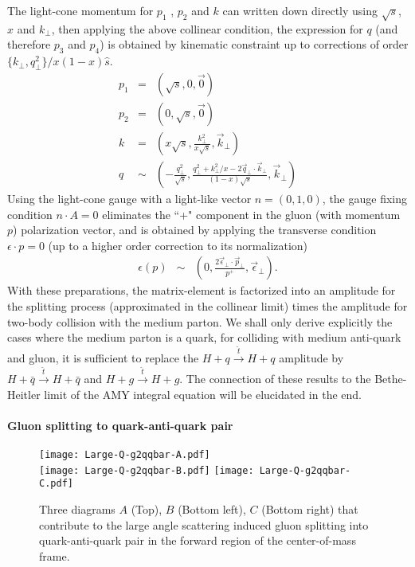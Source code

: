 \begin{appendices}
The light-cone momentum for $p_1$ , $p_2$ and $k$ can written down directly using $\sqrt{s}$, $x$ and $k_\perp$, then applying the above collinear condition, the expression for $q$ (and therefore $p_3$ and $p_4$) is obtained by kinematic constraint up to corrections of order $\{k_\perp, q_\perp^2\}/x(1-x)\hat{s}$.
\begin{eqnarray}
p_1 &=& (\sqrt{s}, 0, \vec{0})\\
p_2 &=& (0, \sqrt{s}, \vec{0})\\
k &=& (x\sqrt{s}, \frac{k_\perp^2}{x\sqrt{s}}, \vec{k}_\perp)\\
q &\sim& (-\frac{q_\perp^2}{\sqrt{s}}, \frac{q_\perp^2 + k_\perp^2/x - 
2\vec{q}_\perp \cdot \vec{k}_\perp}{(1-x)\sqrt{s}}, \vec{k}_\perp)
\end{eqnarray}
Using the light-cone gauge with a light-like vector $n = (0, 1, 0)$, the gauge fixing condition $n\cdot A =0$ eliminates the ``+" component in the gluon (with momentum $p$) polarization vector, and is obtained by applying the transverse condition $\epsilon \cdot p = 0$ (up to a higher order correction to its normalization)
\begin{eqnarray}
\epsilon(p) &\sim& (0, \frac{2\vec{\epsilon}_\perp\cdot\vec{p}_\perp}{p^+}, \vec{\epsilon}_\perp).
\end{eqnarray}
With these preparations, the matrix-element is factorized into an amplitude for the splitting process (approximated in the collinear limit) times the amplitude for two-body collision with the medium parton.
We shall only derive explicitly the cases where the medium parton is a quark, for colliding with medium anti-quark and gluon, it is sufficient to replace the $H+q\xrightarrow{\hat{t}} H+q$ amplitude by $H+\bar{q}\xrightarrow{\hat{t}} H+\bar{q}$ and $H+g\xrightarrow{\hat{t}} H+g$.
The connection of these results to the Bethe-Heitler limit of the AMY integral equation will be elucidated in the end.

\paragraph*{Gluon splitting to quark-anti-quark pair}
\begin{figure}
\singlespacing
\centering
\texttt{[image: Large-Q-g2qqbar-A.pdf]}\\
\vspace{1em}
\texttt{[image: Large-Q-g2qqbar-B.pdf]}\hfill
\texttt{[image: Large-Q-g2qqbar-C.pdf]}
\caption[Three diagrams $A$ (Top), $B$ (Bottom left), $C$ (Bottom right) that]{Three diagrams $A$ (Top), $B$ (Bottom left), $C$ (Bottom right) that contribute to the large angle scattering induced gluon splitting into quark-anti-quark pair in the forward region of the center-of-mass frame.}
\label{fig:feyn-g2qqbar}
\end{figure}


\end{appendices}
